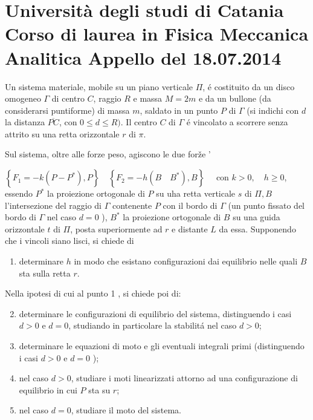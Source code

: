 \documentclass[10pt]{article}
\begin{document}
\section{Università degli studi di Catania
Corso di laurea in Fisica
Meccanica Analitica
Appello del 18.07.2014}
Un sistema materiale, mobile su un piano verticale \(\Pi\), é costituito da un disco omogeneo \(\Gamma\) di centro \(C\), raggio \(R\) e massa \(M=2 m\) e da un bullone (da considerarsi puntiforme) di massa \(m\), saldato in un punto \(P\) di \(\Gamma\) (si indichi con \(d\) la distanza \(\overline{P C}\), con \(0 \leq d \leq R)\). Il centro \(C\) di \(\Gamma\) é vincolato a scorrere senza attrito su una retta orizzontale \(r\) di \(\pi\).

Sul sistema, oltre alle forze peso, agiscono le due forže '

\(\left\{F_{1}=-k\left(P-P^{*}\right), P\right\} \quad\left\{F_{2}=-h\left(B \quad B^{*}\right), B\right\} \quad\) con \(k>0, \quad h \geq 0\), essendo \(P^{*}\) la proiezione ortogonale di \(P\) su uha retta verticale \(s\) di \(\Pi, B\) l'intersezione del raggio di \(\Gamma\) contenente \(P\) con il bordo di \(\Gamma\) (un punto fissato del bordo di \(\Gamma\) nel caso \(d=0\) ), \(B^{*}\) la proiezione ortogonale di \(B\) su una guida orizzontale \(t\) di \(\Pi\), posta superiormente ad \(r\) e distante \(L\) da essa. Supponendo che i vincoli siano lisci, si chiede di

\begin{enumerate}
  \item determinare \(h\) in modo che esistano configurazioni dai equilibrio nelle quali \(B\) sta sulla retta \(r\).
\end{enumerate}

Nella ipotesi di cui al punto 1 , si chiede poi di:

\begin{enumerate}
  \setcounter{enumi}{1}
  \item determinare le configurazioni di equilibrio del sistema, distinguendo i casi \(d>0\) e \(d=0\), studiando in particolare la stabilitá nel caso \(d>0\);

  \item determinare le equazioni di moto e gli eventuali integrali primi (distinguendo i casi \(d>0\) e \(d=0\) );

  \item nel caso \(d>0\), studiare i moti linearizzati attorno ad una configurazione di equilibrio in cui \(P\) sta su \(r\);

  \item nel caso \(d=0\), studiare il moto del sistema.

\end{enumerate}
\end{document}

